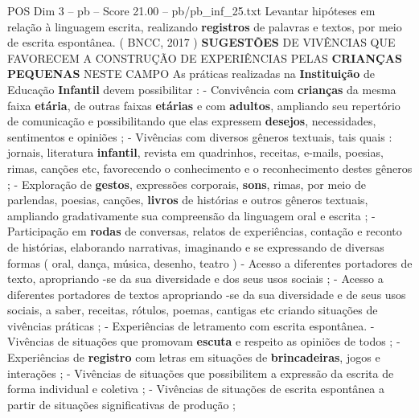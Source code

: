 \begin{textsample}{POS Dim 3 – pb – Score 21.00 – pb/pb\_inf\_25.txt}
Levantar hipóteses em relação à linguagem escrita, realizando \textbf{registros} de palavras e textos, por meio de escrita espontânea. ( BNCC, 2017 ) \textbf{SUGESTÕES} DE VIVÊNCIAS QUE FAVORECEM A CONSTRUÇÃO DE EXPERIÊNCIAS PELAS \textbf{CRIANÇAS} \textbf{PEQUENAS} NESTE CAMPO As práticas realizadas na \textbf{Instituição} de Educação \textbf{Infantil} devem possibilitar : - Convivência com \textbf{crianças} da mesma faixa \textbf{etária}, de outras faixas \textbf{etárias} e com \textbf{adultos}, ampliando seu repertório de comunicação e possibilitando que elas expressem \textbf{desejos}, necessidades, sentimentos e opiniões ; - Vivências com diversos gêneros textuais, tais quais : jornais, literatura \textbf{infantil}, revista em quadrinhos, receitas, e-mails, poesias, rimas, canções etc, favorecendo o conhecimento e o reconhecimento destes gêneros ; - Exploração de \textbf{gestos}, expressões corporais, \textbf{sons}, rimas, por meio de parlendas, poesias, canções, \textbf{livros} de histórias e outros gêneros textuais, ampliando gradativamente sua compreensão da linguagem oral e escrita ; - Participação em \textbf{rodas} de conversas, relatos de experiências, contação e reconto de histórias, elaborando narrativas, imaginando e se expressando de diversas formas ( oral, dança, música, desenho, teatro ) - Acesso a diferentes portadores de texto, apropriando -se da sua diversidade e dos seus usos sociais ; - Acesso a diferentes portadores de textos apropriando -se da sua diversidade e de seus usos sociais, a saber, receitas, rótulos, poemas, cantigas etc criando situações de vivências práticas ; - Experiências de letramento com escrita espontânea. - Vivências de situações que promovam \textbf{escuta} e respeito as opiniões de todos ; - Experiências de \textbf{registro} com letras em situações de \textbf{brincadeiras}, jogos e interações ; - Vivências de situações que possibilitem a expressão da escrita de forma individual e coletiva ; - Vivências de situações de escrita espontânea a partir de situações significativas de produção ;

\end{textsample}
